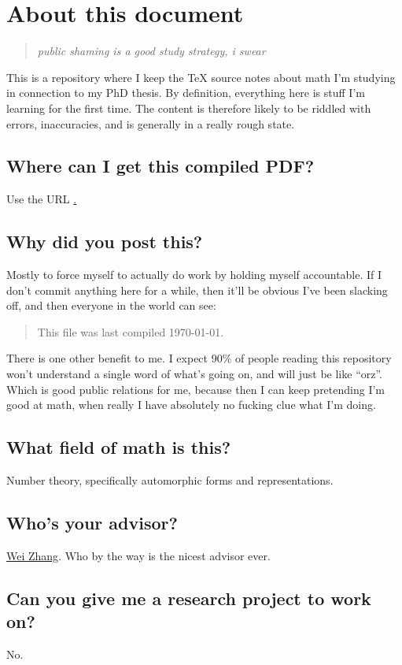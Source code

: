\chapter*{About this document}
\begin{quote}
\itshape public shaming is a good study strategy, i swear
\end{quote}

This is a repository where I keep the TeX source notes about math I'm studying
in connection to my PhD thesis. By definition, everything here is stuff I'm
learning for the first time. The content is therefore likely to be riddled with
errors, inaccuracies, and is generally in a really rough state.

\section*{Where can I get this compiled PDF?}
Use the URL \href{https://web.evanchen.cc/upload/evans-phd-notebook.pdf}.

\section*{Why did you post this?}

Mostly to force myself to actually do work by holding myself accountable. If I
don't commit anything here for a while, then it'll be obvious I've been slacking
off, and then everyone in the world can see:

\begin{quote}
  This file was last compiled \today.
\end{quote}

There is one other benefit to me. I expect 90\% of people reading this repository
won't understand a single word of what's going on, and will just be like ``orz''.
Which is good public relations for me, because then I can keep pretending I'm
good at math, when really I have absolutely no fucking clue what I'm doing.

\section*{What field of math is this?}

Number theory, specifically automorphic forms and representations.

\section*{Who's your advisor?}

\href{https://en.wikipedia.org/wiki/Wei_Zhang_(mathematician)}{Wei Zhang}.
Who by the way is the nicest advisor ever.

\section*{Can you give me a research project to work on?}

No.

